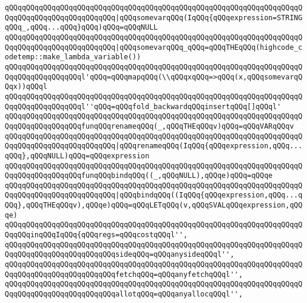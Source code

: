 \verb|qQQqqQQqqQQqqQQqqQQqqQQqqQQqqQQqqQQqqQQqqQQqqQQqqQQqqQQqqQQqqQQqqQQqqQQqqQQqqQQqqQQqqQQqqQQqqQQq|\verb#|qQQqsomevarqQQq(IqQQq{qQQqexpression=STRINGqQQq_,qQQq...qQQq}qQQq)qQQq=qQQqNULL#\newline
\verb|qQQqqQQqqQQqqQQqqQQqqQQqqQQqqQQqqQQqqQQqqQQqqQQqqQQqqQQqqQQqqQQqqQQqqQQqqQQqqQQqqQQqqQQqqQQqqQQq|\verb#|qQQqsomevarqQQq_qQQq=qQQqTHEqQQq(highcode_codetemp::make_lambda_variable())#\newline
\newline
\verb|qQQqqQQqqQQqqQQqqQQqqQQqqQQqqQQqqQQqqQQqqQQqqQQqqQQqqQQqqQQqqQQqqQQqqQQqqQQqqQQqqQQqqQQql'qQQq=qQQqmapqQQq(\\qQQqxqQQq=>qQQq(x,qQQqsomevarqQQqx))qQQql|\newline
\newline
\verb|qQQqqQQqqQQqqQQqqQQqqQQqqQQqqQQqqQQqqQQqqQQqqQQqqQQqqQQqqQQqqQQqqQQqqQQqqQQqqQQqqQQqqQQql''qQQq=qQQqfold_backwardqQQqinsertqQQq[]qQQql'|\newline
\newline
\verb|qQQqqQQqqQQqqQQqqQQqqQQqqQQqqQQqqQQqqQQqqQQqqQQqqQQqqQQqqQQqqQQqqQQqqQQqqQQqqQQqqQQqqQQqfunqQQqrenameqQQq(_,qQQqTHEqQQqv)qQQq=qQQqVARqQQqv|\newline
\verb|qQQqqQQqqQQqqQQqqQQqqQQqqQQqqQQqqQQqqQQqqQQqqQQqqQQqqQQqqQQqqQQqqQQqqQQqqQQqqQQqqQQqqQQqqQQqqQQq|\verb#|qQQqrenameqQQq(IqQQq{qQQqexpression,qQQq...qQQq},qQQqNULL)qQQq=qQQqexpression#\newline
\newline
\verb|qQQqqQQqqQQqqQQqqQQqqQQqqQQqqQQqqQQqqQQqqQQqqQQqqQQqqQQqqQQqqQQqqQQqqQQqqQQqqQQqqQQqqQQqfunqQQqbindqQQq((_,qQQqNULL),qQQqe)qQQq=qQQqe|\newline
\verb|qQQqqQQqqQQqqQQqqQQqqQQqqQQqqQQqqQQqqQQqqQQqqQQqqQQqqQQqqQQqqQQqqQQqqQQqqQQqqQQqqQQqqQQqqQQqqQQq|\verb#|qQQqbindqQQq((IqQQq{qQQqexpression,qQQq...qQQq},qQQqTHEqQQqv),qQQqe)qQQq=qQQqLETqQQq(v,qQQqSVALqQQqexpression,qQQqe)#\newline
\newline
\verb|qQQqqQQqqQQqqQQqqQQqqQQqqQQqqQQqqQQqqQQqqQQqqQQqqQQqqQQqqQQqqQQqqQQqqQQqqQQqinqQQqIqQQq{qQQqregs=qQQqcostqQQql'',|\newline
\verb|qQQqqQQqqQQqqQQqqQQqqQQqqQQqqQQqqQQqqQQqqQQqqQQqqQQqqQQqqQQqqQQqqQQqqQQqqQQqqQQqqQQqqQQqqQQqqQQqsideqQQq=qQQqanysideqQQql'',|\newline
\verb|qQQqqQQqqQQqqQQqqQQqqQQqqQQqqQQqqQQqqQQqqQQqqQQqqQQqqQQqqQQqqQQqqQQqqQQqqQQqqQQqqQQqqQQqqQQqqQQqfetchqQQq=qQQqanyfetchqQQql'',|\newline
\verb|qQQqqQQqqQQqqQQqqQQqqQQqqQQqqQQqqQQqqQQqqQQqqQQqqQQqqQQqqQQqqQQqqQQqqQQqqQQqqQQqqQQqqQQqqQQqqQQqallotqQQq=qQQqanyallocqQQql'',|\newline
